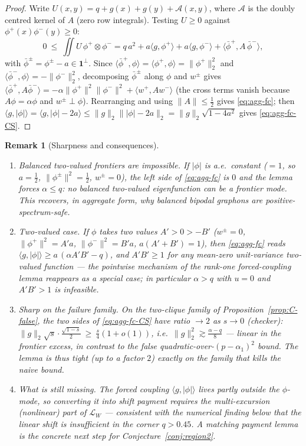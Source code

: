 \documentclass[11pt]{article}
\newtheorem{remark}[theorem]{Remark}
\newcommand{\one}{\mathbf 1}
\newcommand{\ip}[2]{\langle #1,#2\rangle}
\newcommand{\norm}[1]{\lVert #1\rVert}
\begin{document}
\begin{proof}
Write $U(x,y)=q+g(x)+g(y)+\mathcal A(x,y)$, where $\mathcal A$ is the doubly centred kernel of $A$ (zero row integrals).  Testing $U\ge0$ against $\phi^+(x)\phi^-(y)\ge0$:
\[
        0\ \le\ \iint U\,\phi^+\!\otimes\phi^-
        =q\,a^2+a\ip{g}{\phi^+}+a\ip{g}{\phi^-}+\ip{\bar\phi^+}{A\,\bar\phi^-},
\]
with $\bar\phi^\pm=\phi^\pm-a\in\one^\perp$.  Since $\ip{\bar\phi^+}{\phi}=\ip{\phi^+}{\phi}=\norm{\phi^+}_2^2$ and $\ip{\bar\phi^-}{\phi}=-\norm{\phi^-}_2^2$, decomposing $\bar\phi^\pm$ along $\phi$ and $w^\pm$ gives
$\ip{\bar\phi^+}{A\bar\phi^-}=-\alpha\norm{\phi^+}^2\norm{\phi^-}^2+\ip{w^+}{Aw^-}$ (the cross terms vanish because $A\phi=\alpha\phi$ and $w^\pm\perp\phi$).  Rearranging and using $\norm A\le\tfrac12$ gives \eqref{eq:agg-fc}; then $\ip{g}{|\phi|}=\ip{g}{|\phi|-2a}\le\norm g_2\norm{|\phi|-2a}_2=\norm g_2\sqrt{1-4a^2}$ gives \eqref{eq:agg-fc-CS}.
\end{proof}

\begin{remark}[Sharpness and consequences]\label{rmk:agg-fc}
\begin{enumerate}[label=\textup{(\alph*)}]
\item \emph{Balanced two-valued frontiers are impossible.}  If $|\phi|$ is a.e.\ constant ($=1$, so $a=\tfrac12$, $\norm{\phi^\pm}^2=\tfrac12$, $w^\pm=0$), the left side of \eqref{eq:agg-fc} is $0$ and the lemma forces $\alpha\le q$: no balanced two-valued eigenfunction can be a frontier mode.  This recovers, in aggregate form, why balanced bipodal graphons are positive-spectrum-safe.
\item \emph{Two-valued case.}  If $\phi$ takes two values $A'>0>-B'$ ($w^\pm=0$, $\norm{\phi^+}^2=A'a$, $\norm{\phi^-}^2=B'a$, $a(A'+B')=1$), then \eqref{eq:agg-fc} reads $\ip{g}{|\phi|}\ge a\,(\alpha A'B'-q)$, and $A'B'\ge1$ for any mean-zero unit-variance two-valued function --- the pointwise mechanism of the rank-one forced-coupling lemma reappears as a special case; in particular $\alpha>q$ with $u=0$ and $A'B'>1$ is infeasible.
\item \emph{Sharp on the failure family.}  On the two-clique family of Proposition~\ref{prop:C-false}, the two sides of \eqref{eq:agg-fc-CS} have ratio $\to2$ as $s\to0$ (checker): $\norm g_2\sqrt s\cdot\tfrac{\sqrt{1-s}}2\ \ge\ \tfrac s4(1+o(1))$, i.e.\ $\norm g_2^2\gtrsim\tfrac{\alpha-q}{8}$ --- \emph{linear} in the frontier excess, in contrast to the false quadratic-over-$(p-\alpha_1)^2$ bound.  The lemma is thus tight (up to a factor $2$) exactly on the family that kills the naive bound.
\item \emph{What is still missing.}  The forced coupling $\ip{g}{|\phi|}$ lives partly outside the $\phi$-mode, so converting it into shift payment requires the multi-excursion (nonlinear) part of $\mathcal L_W$ --- consistent with the numerical finding below that the linear shift is insufficient in the corner $q>0.45$.  A matching payment lemma is the concrete next step for Conjecture~\ref{conj:region2}.
\end{enumerate}
\end{remark}
\end{document}
